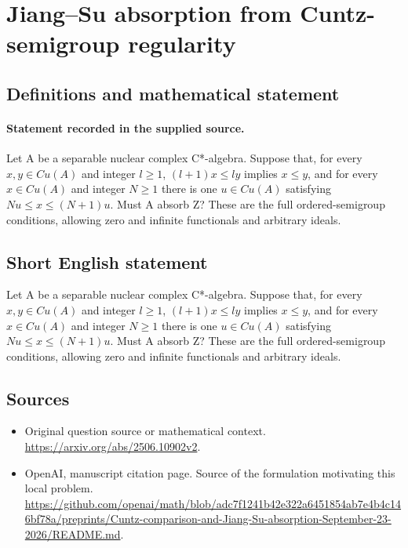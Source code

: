 \documentclass[11pt]{article}
\begin{document}
\section*{Jiang–Su absorption from Cuntz-semigroup regularity}\label{30007307}
\subsection{Definitions and mathematical statement}
\paragraph{Statement recorded in the supplied source.}
Let A be a separable nuclear complex C*-algebra. Suppose that, for every $x,y\in Cu(A)$ and integer $l\geq 1$, $(l+1)x\leq ly$ implies $x\leq y$, and for every $x\in Cu(A)$ and integer $N\geq 1$ there is one $u\in Cu(A)$ satisfying $Nu\leq x\leq (N+1)u$. Must A absorb Z? These are the full ordered-semigroup conditions, allowing zero and infinite functionals and arbitrary ideals.
\subsection{Short English statement}
Let A be a separable nuclear complex C*-algebra. Suppose that, for every $x,y\in Cu(A)$ and integer $l\geq 1$, $(l+1)x\leq ly$ implies $x\leq y$, and for every $x\in Cu(A)$ and integer $N\geq 1$ there is one $u\in Cu(A)$ satisfying $Nu\leq x\leq (N+1)u$. Must A absorb Z? These are the full ordered-semigroup conditions, allowing zero and infinite functionals and arbitrary ideals.
\subsection{Sources}
\begin{itemize}
\item[S1] Original question source or mathematical context.
\url{https://arxiv.org/abs/2506.10902v2}.
\item[S2] OpenAI, manuscript citation page. Source of the formulation motivating this local problem.
\url{https://github.com/openai/math/blob/adc7f1241b42e322a6451854ab7e4b4c146bf78a/preprints/Cuntz-comparison-and-Jiang-Su-absorption-September-23-2026/README.md}.
\end{itemize}
\end{document}
